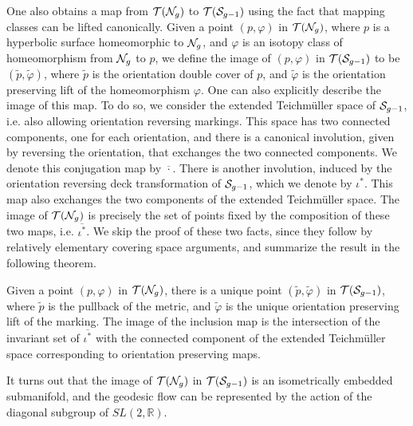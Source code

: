 \documentclass[12pt, reqno]{amsart}
\begin{document}
One also obtains a map from $\mathcal{T}(\mathcal{N}_g)$ to $\mathcal{T}(\mathcal{S}_{g-1})$ using the fact that mapping classes can be lifted canonically.
Given a point $(p, \varphi)$ in $\mathcal{T}(\mathcal{N}_g)$, where $p$ is a hyperbolic surface homeomorphic to $\mathcal{N}_g$, and $\varphi$ is an isotopy class of homeomorphism from $\mathcal{N}_g$ to $p$, we define the image of $(p, \varphi)$ in $\mathcal{T}(\mathcal{S}_{g-1})$ to be $(\widetilde{p}, \widetilde{\varphi})$, where $\widetilde{p}$ is the orientation double cover of $p$, and $\widetilde{\varphi}$ is the orientation preserving lift of the homeomorphism $\varphi$.
One can also explicitly describe the image of this map.
To do so, we consider the extended Teichmüller space of $\mathcal{S}_{g-1}$, i.e. also allowing orientation reversing markings.
This space has two connected components, one for each orientation, and there is a canonical involution, given by reversing the orientation, that exchanges the two connected components.
We denote this conjugation map by $\overline{\cdot}$.
There is another involution, induced by the orientation reversing deck transformation of $\mathcal{S}_{g-1}$, which we denote by $\iota^{\ast}$.
This map also exchanges the two components of the extended Teichmüller space.
The image of $\mathcal{T}(\mathcal{N}_g)$ is precisely the set of points fixed by the composition of these two maps, i.e. $\overline{\iota^{\ast}}$.
We skip the proof of these two facts, since they follow by relatively elementary covering space arguments, and summarize the result in the following theorem.

\begin{theorem}
  \label{thm:embedding-teich}
  Given a point $(p, \varphi)$ in $\mathcal{T}(\mathcal{N}_g)$, there is a unique point $(\widetilde{p}, \widetilde{\varphi})$ in $\mathcal{T}(\mathcal{S}_{g-1})$, where $\widetilde{p}$ is the pullback of the metric, and $\widetilde{\varphi}$ is the unique orientation preserving lift of the marking. The image of the inclusion map is the intersection of the invariant set of $\overline{\iota^\ast}$ with the connected component of the extended Teichmüller space corresponding to orientation preserving maps.
\end{theorem}

It turns out that the image of $\mathcal{T}(\mathcal{N}_g)$ in $\mathcal{T}(\mathcal{S}_{g-1})$ is an isometrically embedded submanifold, and the geodesic flow can be represented by the action of the diagonal subgroup of $SL(2, \mathbb{R})$.
\end{document}
